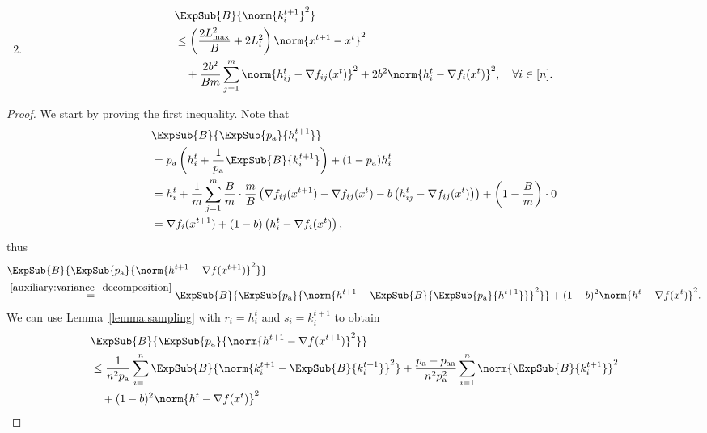 \documentclass{article}
\newcommand*{\probavailable}{\ensuremath{p_{\textnormal{a}}}}
\newcommand*{\probpairaa}{\ensuremath{p_{\textnormal{aa}}}}
\begin{document}
\begin{lemma}
\begin{enumerate}
\begin{align*}
      \end{align*}
  \item
      \begin{align*}
        &\ExpSub{B}{\norm{k^{t+1}_i}^2} \\
        &\leq \left(\frac{2 L_{\max}^2}{B} + 2 L_i^2\right)\norm{x^{t+1} - x^{t}}^2 \\
        &\quad + \frac{2 b^2}{B m}\sum_{j=1}^m\norm{h^t_{ij} - \nabla f_{ij}(x^{t})}^2 + 2 b^2 \norm{h^t_i - \nabla f_i(x^{t})}^2, \quad \forall i \in [n].
      \end{align*}
  \end{enumerate}
\end{lemma}

\begin{proof}
  We start by proving the first inequality. Note that
  \begin{align*}
    &\ExpSub{B}{\ExpSub{\probavailable}{h^{t+1}_i}} \\
    & =\probavailable \left(h^t_i + \frac{1}{\probavailable}\ExpSub{B}{k^{t+1}_i}\right) + (1 - \probavailable) h^t_i \\
    & =h^t_i + \frac{1}{m}\sum_{j=1}^m \frac{B}{m} \cdot \frac{m}{B}\left(\nabla f_{ij}(x^{t+1}) - \nabla f_{ij}(x^{t}) - b \left(h^t_{ij} - \nabla f_{ij}(x^{t})\right)\right) + \left(1 - \frac{B}{m}\right) \cdot 0 \\
    & =\nabla f_{i}(x^{t+1}) + (1 - b) \left(h^t_{i} - \nabla f_{i}(x^{t})\right),
  \end{align*}
  thus
  \begin{align*}
    &\ExpSub{B}{\ExpSub{\probavailable}{\norm{h^{t+1} - \nabla f(x^{t+1})}^2}} \\
    &\overset{\eqref{auxiliary:variance_decomposition}}{=}\ExpSub{B}{\ExpSub{\probavailable}{\norm{h^{t+1} - \ExpSub{B}{\ExpSub{\probavailable}{h^{t+1}}}}^2}} + (1 - b)^2\norm{h^{t} - \nabla f(x^{t})}^2.
  \end{align*}
  We can use Lemma~\ref{lemma:sampling} with $r_i = h^{t}_i$ and $s_i = k^{t+1}_i$ to obtain
  \begin{align*}
    &\ExpSub{B}{\ExpSub{\probavailable}{\norm{h^{t+1} - \nabla f(x^{t+1})}^2}} \\
    &\leq \frac{1}{n^2 \probavailable}\sum_{i=1}^n\ExpSub{B}{\norm{k^{t+1}_i - \ExpSub{B}{k^{t+1}_i}}^2} +\frac{\probavailable - \probpairaa}{n^2 \probavailable^2}\sum_{i=1}^n\norm{\ExpSub{B}{k^{t+1}_i}}^2 \\
    &\quad + (1 - b)^2\norm{h^{t} - \nabla f(x^{t})}^2\\

\end{align*}
\end{proof}
\end{document}
